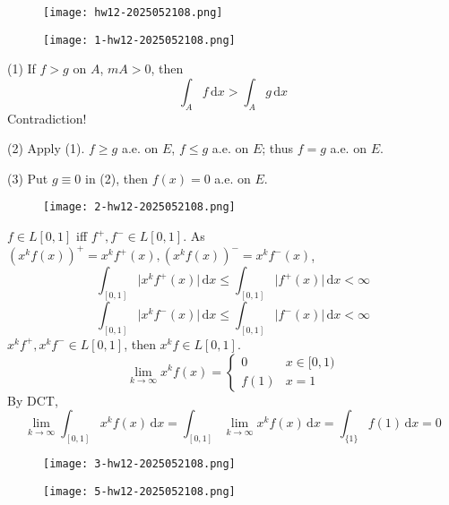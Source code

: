 \begin{exercise}
\begin{figure}[H]
\centering
\texttt{[image: hw12-2025052108.png]}
\label{}
\end{figure}
\begin{figure}[H]
\centering
\texttt{[image: 1-hw12-2025052108.png]}
\label{}
\end{figure}
\end{exercise}
(1)
If $f>g$ on $A$, $mA>0$, then
\[
\int_{A}^{} f \, \mathrm{d}x >\int_{A}^{} g \, \mathrm{d}x
\]
Contradiction!

(2)
Apply (1). $f\geq g$ a.e. on $E$, $f\leq g$ a.e. on $E$; thus $f=g$ a.e. on $E$.

(3)
Put $g\equiv0$ in (2), then $f(x)=0$ a.e. on $E$.

\begin{exercise}
\begin{figure}[H]
\centering
\texttt{[image: 2-hw12-2025052108.png]}
\label{}
\end{figure}
\end{exercise}
$f\in L[0,1]$ iff $f^{+},f^{-}\in L[0,1]$. As $(x^{k}f(x))^{+}=x^{k}f^{+}(x),(x^{k}f(x))^{-}=x^{k}f^{-}(x)$,
\[
\int_{[0,1]}^{} \lvert x^{k}f^{+}(x)  \rvert \, \mathrm{d}x \leq \int_{[0,1]}^{} \lvert f^{+}(x) \rvert  \, \mathrm{d}x <\infty
\]
\[
\int_{[0,1]}^{} \lvert x^{k}f^{-}(x) \rvert  \, \mathrm{d}x \leq \int_{[0,1]}^{} \lvert f^{-}(x) \rvert  \, \mathrm{d}x <\infty
\]
$x^{k}f^{+}, x^{k}f^{-}\in L[0,1]$, then $x^{k}f\in L[0,1]$.
\[
\lim_{ k \to \infty } x^{k}f(x)=\begin{cases}
0 & x\in[0,1) \\
f(1) & x=1
\end{cases}
\]
By DCT,
\[
\lim_{ k \to \infty } \int_{[0,1]}^{} x^{k}f(x) \, \mathrm{d}x = \int_{[0,1]}^{} \lim_{ k \to \infty } x^{k}f(x) \, \mathrm{d}x =\int_{\{ 1 \}}^{} f(1) \, \mathrm{d}x =0
\]
\begin{exercise}
\begin{figure}[H]
\centering
\texttt{[image: 3-hw12-2025052108.png]}
\label{}
\end{figure}
\begin{figure}[H]
\centering
\texttt{[image: 5-hw12-2025052108.png]}
\label{}
\end{figure}\label{c2dff9}
\end{exercise}

